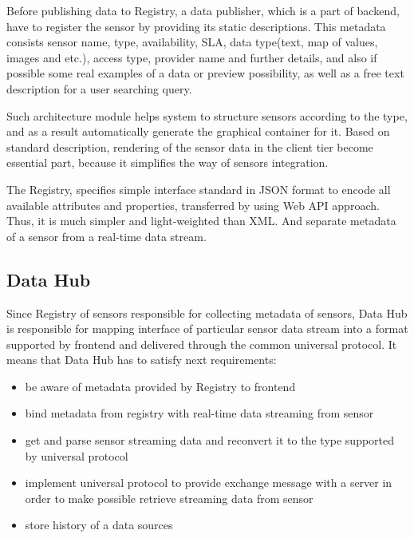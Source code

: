     Before publishing data to Registry, a data publisher, which is a part of backend, have to register the sensor by providing its static descriptions. This metadata consists sensor name, type, availability, SLA, data type(text, map of values, images and etc.), access type, provider name and further details, and also if possible some real examples of a data or preview possibility, as well as a free text description for a user searching query.

    Such architecture module helps system to structure sensors according to the type,  and as a result automatically generate the graphical container for it. Based on standard description, rendering of the sensor data in the client tier become essential part, because it simplifies the way of sensors integration. 

    The Registry, specifies simple interface standard in JSON format to encode all available attributes and properties, transferred by using Web API approach. Thus, it is much simpler and light-weighted than XML. And separate metadata of a sensor from a real-time data stream. 

  \subsection{Data Hub}
    Since Registry of sensors responsible for collecting metadata of sensors, Data Hub is responsible for mapping interface of particular sensor data stream into a format supported by frontend and delivered through the common universal protocol. It means that Data Hub has to satisfy next requirements:

    \begin{itemize}
    \item be aware of metadata provided by Registry to frontend
    \item bind metadata from registry with real-time data streaming from sensor
    \item get and parse sensor streaming data and reconvert it to the type supported by universal protocol
    \item implement universal protocol to provide exchange message with a server in order to make possible retrieve streaming data from sensor
    \item store history of a data sources
    \end{itemize}

